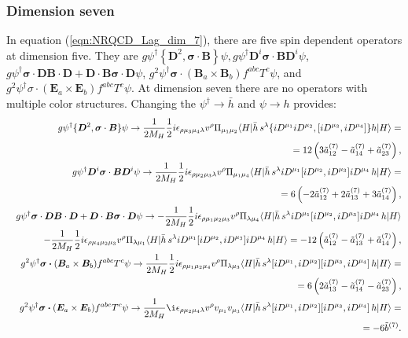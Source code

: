 \subsubsection{Dimension seven}
\vspace{-0.2cm}
In equation (\ref{eqn:NRQCD_Lag_dim_7}), there are five spin dependent operators at dimension five. They are $g \psi^{\dagger}\left\{\bm{D}^{2}, \bm{\sigma} \cdot \bm{B}\right\} \psi, g \psi^{\dagger} \bm{D}^{i} \bm{\sigma} \cdot \bm{B} \bm{D}^{i} \psi$, $g\psi^{\dagger} \bm{\sigma} \cdot \bm{D} \bm{B} \cdot \bm{D}+\bm{D} \cdot \bm{B} \bm{\sigma} \cdot \bm{D} \psi$, $g^{2} \psi^{\dagger} \bm{\sigma} \cdot\left(\bm{B}_{a} \times \bm{B}_{b}\right) f^{a b c} T^{c} \psi$, and $g^{2} \psi^{\dagger} \sigma \cdot\left(\bm{E}_{a} \times \bm{E}_{b}\right) f^{a b c} T^{c} \psi$. At dimension seven there are no operators with multiple color structures. Changing the $\psi^{\dagger}\to \bar{h}$ and $\psi\to h$ provides:
\begin{eqnarray}
&&g \psi^\dagger \{ \bm{D}^2 ,  \bm{\sigma}\cdot \bm{B} \}\psi\to  \dfrac1{2M_H}\dfrac12i\epsilon_{\rho\mu_3\mu_4\lambda}v^\rho \Pi_{\mu_1\mu_2}\langle H |\bar h\,s^\lambda \{iD^{\mu_1}iD^{\mu_2},[iD^{\mu_3},iD^{\mu_4}]\}h|H\rangle=\nonumber\\
&&=12 \left(3 \tilde{a}_{12}^{(7)} -\tilde{a}_{14}^{(7)} + \tilde{a}_{23}^{(7)}\right),\nonumber\\
%
&&g\psi^\dagger \bm{D}^i \bm{\sigma}\cdot \bm{B} \bm{D}^i\psi\to  \dfrac1{2M_H}\dfrac12i\epsilon_{\rho\mu_2\mu_3\lambda}v^\rho \Pi_{\mu_1\mu_4}\langle H |\bar h\,s^\lambda iD^{\mu_1}[iD^{\mu_2},iD^{\mu_3}]iD^{\mu_4}\,h|H\rangle=\nonumber\\
&&=6 \left(-2 \tilde{a}_{12}^{(7)} +2\tilde{a}_{13}^{(7)} +3 \tilde{a}_{14}^{(7)}\right),\nonumber\\
&&g\psi^\dagger  \bm{\sigma} \cdot\bm{D} \bm{B}\cdot \bm{D} + \bm{D}\cdot\bm{B} \bm{\sigma}\cdot \bm{D}\psi\to  -\dfrac1{2M_H}\dfrac12i\epsilon_{\rho\mu_1\mu_2\mu_3}v^\rho \Pi_{\lambda\mu_4}\langle H |\bar h\,s^\lambda iD^{\mu_1}[iD^{\mu_2},iD^{\mu_3}]iD^{\mu_4}\,h|H\rangle\nonumber\\
&&-\dfrac1{2M_H}\dfrac12i\epsilon_{\rho\mu_4\mu_2\mu_3}v^\rho \Pi_{\lambda\mu_1}\langle H |\bar h\,s^\lambda iD^{\mu_1}[iD^{\mu_2},iD^{\mu_3}]iD^{\mu_4}\,h|H\rangle=-12 \left( \tilde{a}_{12}^{(7)} -\tilde{a}_{13}^{(7)} + \tilde{a}_{14}^{(7)}\right),\nonumber\\
&&g^2\psi^\dagger \bm{\sigma\cdot} (\bm{B}_a\times\bm{B}_b)f^{abc}T^c \psi\to  \dfrac1{2M_H}\dfrac12i\epsilon_{\rho\mu_1\mu_2\mu_4}v^\rho \Pi_{\lambda\mu_3}\langle H |\bar h\,s^\lambda[iD^{\mu_1},iD^{\mu_2}][iD^{\mu_3},iD^{\mu_4}]\,h|H\rangle=\nonumber\\
&&=6 \left(2 \tilde{a}_{13}^{(7)} -\tilde{a}_{14}^{(7)} - \tilde{a}_{23}^{(7)}\right),\nonumber\\
%
&&g^2\psi^\dagger \bm{\sigma\cdot}( \bm{E}_a\times\bm{E}_b)f^{abc}T^c \psi\to  \dfrac1{2M_H}\i\epsilon_{\rho\mu_2\mu_4\lambda}v^\rho v_{\mu_1}v_{\mu_3}\langle H |\bar h\,s^\lambda[iD^{\mu_1},iD^{\mu_2}][iD^{\mu_3},iD^{\mu_4}]\,h|H\rangle=\nonumber\\
&&=-6 \tilde{b}^{(7)}.
\end{eqnarray}
